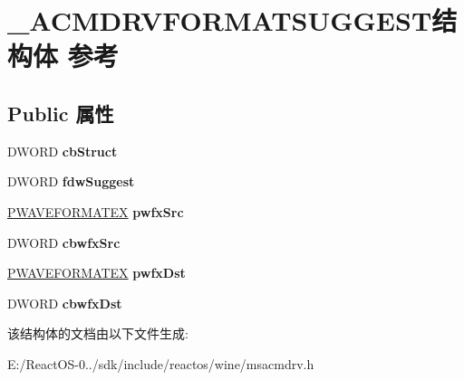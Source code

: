 \hypertarget{struct___a_c_m_d_r_v_f_o_r_m_a_t_s_u_g_g_e_s_t}{}\section{\+\_\+\+A\+C\+M\+D\+R\+V\+F\+O\+R\+M\+A\+T\+S\+U\+G\+G\+E\+S\+T结构体 参考}
\label{struct___a_c_m_d_r_v_f_o_r_m_a_t_s_u_g_g_e_s_t}
\subsection*{Public 属性}
\begin{DoxyCompactItemize}
\item 
\mbox{\label{struct___a_c_m_d_r_v_f_o_r_m_a_t_s_u_g_g_e_s_t_a4edb1f8e37dca28a29ef43b74c373944}} 
D\+W\+O\+RD {\bfseries cb\+Struct}
\item 
\mbox{\label{struct___a_c_m_d_r_v_f_o_r_m_a_t_s_u_g_g_e_s_t_a1b15267daa40a97f94d5528f7fe7a182}} 
D\+W\+O\+RD {\bfseries fdw\+Suggest}
\item 
\mbox{\label{struct___a_c_m_d_r_v_f_o_r_m_a_t_s_u_g_g_e_s_t_a3f6a5fdc5cfe116f27c2aa03a1cfe339}} 
\hyperlink{struct___w_a_v_e_f_o_r_m_a_t_e_x}{P\+W\+A\+V\+E\+F\+O\+R\+M\+A\+T\+EX} {\bfseries pwfx\+Src}
\item 
\mbox{\label{struct___a_c_m_d_r_v_f_o_r_m_a_t_s_u_g_g_e_s_t_a8c3d2c3a8c8359ef36d684e6814f9281}} 
D\+W\+O\+RD {\bfseries cbwfx\+Src}
\item 
\mbox{\label{struct___a_c_m_d_r_v_f_o_r_m_a_t_s_u_g_g_e_s_t_a940ead75500bf8b19e5d8fa99b7ac769}} 
\hyperlink{struct___w_a_v_e_f_o_r_m_a_t_e_x}{P\+W\+A\+V\+E\+F\+O\+R\+M\+A\+T\+EX} {\bfseries pwfx\+Dst}
\item 
\mbox{\label{struct___a_c_m_d_r_v_f_o_r_m_a_t_s_u_g_g_e_s_t_ac452c1bedb2f1005bbab7c898cb0b046}} 
D\+W\+O\+RD {\bfseries cbwfx\+Dst}
\end{DoxyCompactItemize}


该结构体的文档由以下文件生成\+:\begin{DoxyCompactItemize}
\item 
E\+:/\+React\+O\+S-\/0../sdk/include/reactos/wine/msacmdrv.\+h\end{DoxyCompactItemize}
